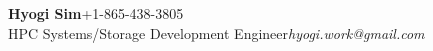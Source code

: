 {\textbf{\Large Hyogi Sim}\hfill{\small +1-865-438-3805}}\\
{\small
{HPC Systems/Storage Development Engineer}\hfill{\emph{\small hyogi.work@gmail.com}}\\
}
